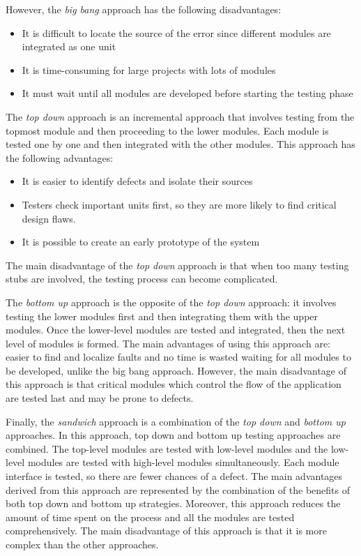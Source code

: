 However, the \emph{big bang} approach has the following disadvantages:

\begin{itemize}
	\item It is difficult to locate the source of the error since different modules are integrated as one unit
	\item It is time-consuming for large projects with lots of modules
	\item It must wait until all modules are developed before starting the testing phase
\end{itemize}

The \emph{top down} approach is an incremental approach that involves testing from the topmost module and then proceeding to the lower modules.
Each module is tested one by one and then integrated with the other modules. This approach has the following advantages:

\begin{itemize}
	\item It is easier to identify defects and isolate their sources
	\item Testers check important units first, so they are more likely to find critical design flaws.
	\item It is possible to create an early prototype of the system
\end{itemize}

The main disadvantage of the \emph{top down} approach is that when too many testing stubs are involved, the testing process can become complicated.

The \emph{bottom up} approach is the opposite of the \emph{top down} approach: it involves testing the lower modules first and then integrating
them with the upper modules. Once the lower-level modules are tested and integrated, then the next level of modules is formed.
The main advantages of using this approach are: easier to find and localize faults and no time is wasted waiting for all modules to be developed,
unlike the big bang approach. However, the main disadvantage of this approach is that critical modules which control the flow of the application are
tested last and may be prone to defects.

Finally, the \emph{sandwich} approach is a combination of the \emph{top down} and \emph{bottom up} approaches. In this approach, top down and bottom
up testing approaches are combined. The top-level modules are tested with low-level modules and the low-level modules are tested with high-level
modules simultaneously. Each module interface is tested, so there are fewer chances of a defect.
The main advantages derived from this approach are represented by the combination of the benefits of both top down and bottom up strategies.
Moreover, this approach reduces the amount of time spent on the process and all the modules are tested comprehensively.
The main disadvantage of this approach is that it is more complex than the other approaches.

